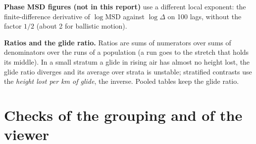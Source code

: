 \textbf{Phase MSD figures (not in this report)} use a different local exponent: the finite-difference derivative of $\log\mathrm{MSD}$
against $\log\Delta$ on 100 lags, without the factor $1/2$ (about 2 for ballistic motion).

\textbf{Ratios and the glide ratio.} Ratios are sums of numerators over sums of denominators over the runs of a population (a run
goes to the stretch that holds its middle). In a small stratum a glide in rising air has almost no height lost, the glide ratio
diverges and its average over strata is unstable; stratified contrasts use the \emph{height lost per km of glide}, the inverse. Pooled tables keep the glide ratio.

\section{Checks of the grouping and of the viewer}\label{app:audit}

